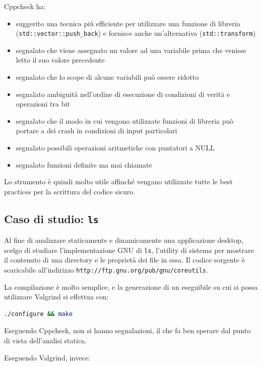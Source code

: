 \documentclass{article}
\begin{document}
Cppcheck ha:

\begin{itemize}
    \item suggerito una tecnica più efficiente per utilizzare una funzione di
    libreria (\texttt{std::vector::push\_back}) e fornisce anche un'alternativa
    (\texttt{std::transform})
    \item segnalato che viene assegnato un valore ad una variabile prima che
    venisse letto il suo valore precedente
    \item segnalato che lo scope di alcune variabili può essere ridotto
    \item segnalato ambiguità nell'ordine di esecuzione di condizioni di verità
    e operazioni tra bit
    \item segnalato che il modo in cui vengono utilizzate funzioni di libreria
    può portare a dei crash in condizioni di input particolari
    \item segnalato possibili operazioni aritmetiche con puntatori a NULL
    \item segnalato funzioni definite ma mai chiamate
\end{itemize}

Lo strumento è quindi molto utile affinché vengano utilizzate tutte le best
practices per la scrittura del codice sicuro.

\subsection{Caso di studio: \texttt{ls}}

Al fine di analizzare staticamente e dinamicamente una applicazione desktop,
scelgo di studiare l'implementazione GNU di \texttt{ls}, l'utility di sistema
per mostrare il contenuto di una directory e le proprietà dei file in essa.
Il codice sorgente è scaricabile all'indirizzo
\texttt{http://ftp.gnu.org/pub/gnu/coreutils}.

La compilazione è molto semplice, e la generazione di un eseguibile su cui si
possa utilizzare Valgrind si effettua con:

\begin{lstlisting}[language=bash]
./configure && make
\end{lstlisting}

Eseguendo Cppcheck, non si hanno segnalazioni, il che fa ben sperare dal punto
di vista dell'analisi statica.

Eseguendo Valgrind, invece:
\end{document}
